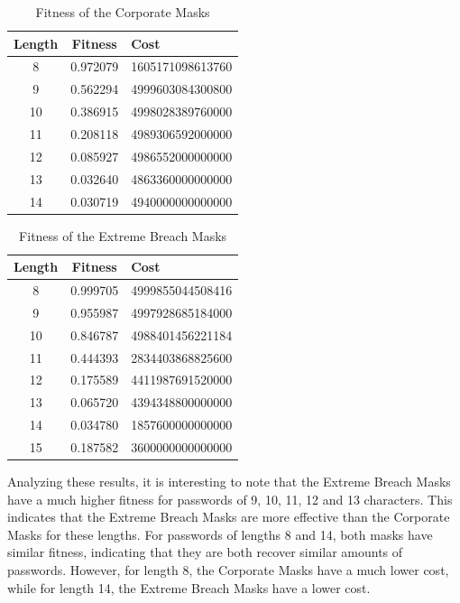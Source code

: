 \documentclass[sigconf,authordraft]{acmart}
\begin{document}
\begin{table}
  \caption{Fitness of the Corporate Masks}
  \label{tab:fitness_corporate}
  \begin{tabular}{ccl}
    \toprule
    Length & Fitness & Cost \\
    \midrule
    8 & 0.972079 & 1605171098613760	 \\
    9 & 0.562294 & 4999603084300800 \\
    10 & 0.386915	 & 4998028389760000 \\
    11 & 0.208118	 & 4989306592000000 \\
    12 & 0.085927 & 4986552000000000	 \\
    13 & 0.032640	 & 4863360000000000 \\
    14 & 0.030719 & 4940000000000000 \\
    \bottomrule
  \end{tabular}
\end{table}

\begin{table}
  \caption{Fitness of the Extreme Breach Masks}
  \label{tab:fitness_extreme}
  \begin{tabular}{ccl}
    \toprule
    Length & Fitness & Cost \\
    \midrule
    8 & 0.999705 & 4999855044508416	 \\
    9 & 0.955987 & 4997928685184000 \\
    10 & 0.846787 & 4988401456221184 \\
    11 & 0.444393	 & 2834403868825600 \\
    12 & 0.175589 & 4411987691520000	 \\
    13 & 0.065720	 & 4394348800000000 \\
    14 & 0.034780	 & 1857600000000000 \\
    15 & 0.187582 & 3600000000000000 \\
    \bottomrule
  \end{tabular}
\end{table}

Analyzing these results, it is interesting to note that the Extreme Breach Masks have a much higher fitness for passwords of 9, 10, 11, 12 and 13 characters.
This indicates that the Extreme Breach Masks are more effective than the Corporate Masks for these lengths.
For passwords of lengths 8 and 14, both masks have similar fitness, indicating that they are both recover similar amounts of passwords.
However, for length 8, the Corporate Masks have a much lower cost, while for length 14, the Extreme Breach Masks have a lower cost.
\end{document}
